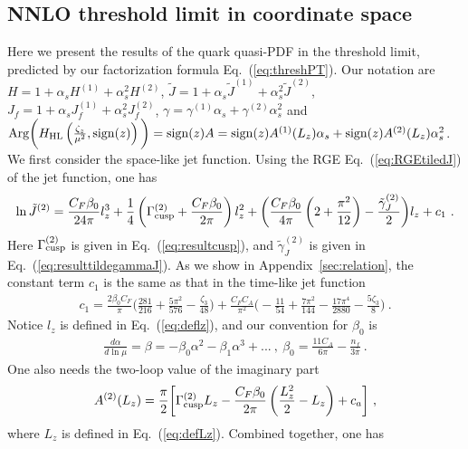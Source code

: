 \documentclass[a4paper,11pt]{article}
\begin{document}
\subsection{NNLO threshold limit in coordinate space}\label{sec:thresholcord}
Here we present the results of the quark quasi-PDF in the threshold limit, predicted by our factorization formula Eq.~(\ref{eq:threshPT}). Our notation are $H=1+\alpha_s H^{(1)}+\alpha_s^2 H^{(2)}$, $\tilde J = 1 + \alpha_s \tilde J^{(1)} + \alpha_s^2 \tilde J^{(2)}$, $J_f=1+\alpha_s J_f^{(1)}+\alpha_s^2 J_f^{(2)}$, $\gamma=\gamma^{(1)}\alpha_s+\gamma^{(2)}\alpha_s^2$ and ${\rm Arg}\bigg(H_{\rm HL}\left(\frac{\zeta_z}{\mu^2},{\rm sign}(z)\right)\bigg)={\rm sign}(z) A ={\rm sign}(z) A^{(1)}(L_z) \alpha_s + {\rm sign}(z) A^{(2)}(L_z) \alpha_s^2$. We first consider the space-like jet function. Using the RGE Eq.~(\ref{eq:RGEtiledJ}) of the jet function, one has
\begin{align}\label{jettwoloop}
\ln \tilde J^{(2)}=\frac{C_F\beta_0}{24\pi}l_z^3+\frac{1}{4}\left(\Gamma^{(2)}_{\rm cusp}+\frac{C_F\beta_0}{2\pi}\right)l_z^2+\bigg(\frac{C_F\beta_0}{4\pi}\left(2+\frac{\pi^2}{12}\right)-\frac{\tilde \gamma_{J}^{(2)}}{2}\bigg)l_z+c_1 \ .
\end{align}
Here $\Gamma_{\rm cusp}^{(2)}$ is given in Eq.~(\ref{eq:resultcusp}), and $\tilde \gamma_J^{(2)}$ is given in Eq.~(\ref{eq:resulttildegammaJ}). As we show in Appendix~\ref{sec:relation}, the constant term $c_1$ is the same as that in the time-like jet function~\cite{Jain:2008gb}
\begin{align}\label{eq:resultc1}
c_1=\frac{2\beta_0C_F}{\pi}\bigg(\frac{281}{216}+\frac{5\pi^2}{576}-\frac{\zeta_3}{48}\bigg)+\frac{C_FC_A}{\pi^2}\bigg(-\frac{11}{54}+\frac{7\pi^2}{144}-\frac{17\pi^4}{2880}-\frac{5\zeta_3}{8}\bigg) \ .
\end{align} 
Notice $l_z$ is defined in Eq.~(\ref{eq:deflz}), and our convention for $\beta_0$ is
\begin{align}\label{eq:beta}
    \frac{d\alpha}{d\ln \mu}=\beta =-\beta_0 \alpha^2 - \beta_1 \alpha^3 +... \ ,  \ 
    \beta_0=\frac{11C_A}{6\pi}-\frac{n_f}{3\pi} \ .
\end{align}
One also needs the two-loop value of the imaginary part\label{eq:jet ima}
\begin{align}
A^{(2)}(L_z)=\frac{\pi}{2}\bigg[\Gamma^{(2)}_{\rm cusp}L_z-\frac{C_F\beta_0}{2\pi}\left(\frac{L_z^2}{2}-L_z\right)+c_a\bigg] \ ,
\end{align}
where $L_z$ is defined in Eq.~(\ref{eq:defLz}). Combined together, one has
\end{document}
